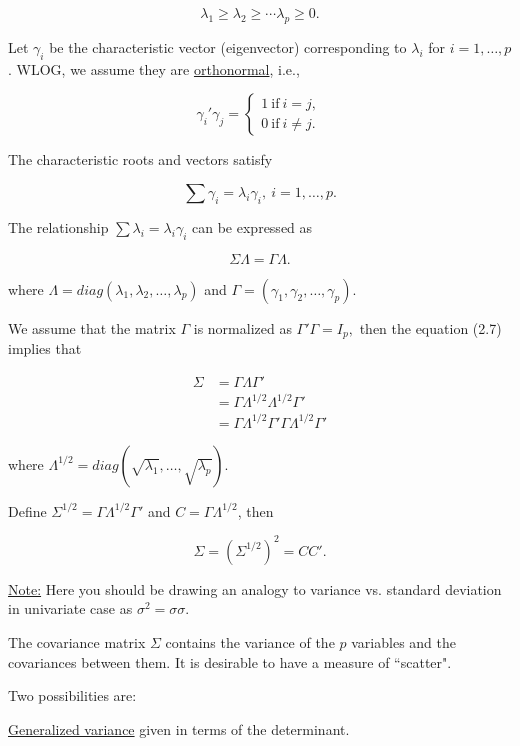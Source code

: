 \documentclass[twoside]{article}
\begin{document}
$$\lambda_1\geq\lambda_2\geq\cdots\lambda_p\geq 0.$$

Let $\gamma_i$ be the characteristic vector (eigenvector) corresponding to $\lambda_i$ for $i=1,\dots, p$. WLOG, we assume they are \underline{orthonormal}, i.e.,

$$\gamma_i'\gamma_j=\begin{cases}
	1\ \text{if}\ i=j,\\
	0\ \text{if}\ i\not=j.
\end{cases}$$

The characteristic roots and vectors satisfy

$$\sum\gamma_i=\lambda_i\gamma_i,\ i=1,\dots,p.$$

The relationship $\sum\lambda_i=\lambda_i\gamma_i$ can be expressed as

\begin{equation}\Sigma\Lambda=\Gamma\Lambda.	
\end{equation}

where $\Lambda=diag(\lambda_1,\lambda_2,\dots,\lambda_p)$ and $\Gamma=(\gamma_1,\gamma_2,\dots,\gamma_p)$.

We assume that the matrix $\Gamma$ is normalized as $\Gamma'\Gamma=I_p,$ then the equation (2.7) implies that

\begin{equation}
	\begin{split}
		\Sigma &=\Gamma\Lambda\Gamma'\\
		&=\Gamma\Lambda^{1/2}\Lambda^{1/2}\Gamma'\\
		&=\Gamma\Lambda^{1/2}\Gamma'\Gamma\Lambda^{1/2}\Gamma'
	\end{split}
\end{equation}

where $\Lambda^{1/2}=diag(\sqrt{\lambda_1},\dots,\sqrt{\lambda_p}).$

Define $\Sigma^{1/2}=\Gamma\Lambda^{1/2}\Gamma'$ and $C=\Gamma\Lambda^{1/2}$, then

$$\Sigma=(\Sigma^{1/2})^2=CC'.$$

\underline{Note:} Here you should be drawing an analogy to variance vs. standard deviation in univariate case as $\sigma^2=\sigma\sigma.$

The covariance matrix $\Sigma$ contains the variance of the $p$ variables and the covariances between them. It is desirable to have a measure of ``scatter".

Two possibilities are:

\underline{Generalized variance} given in terms of the determinant.
\end{document}
